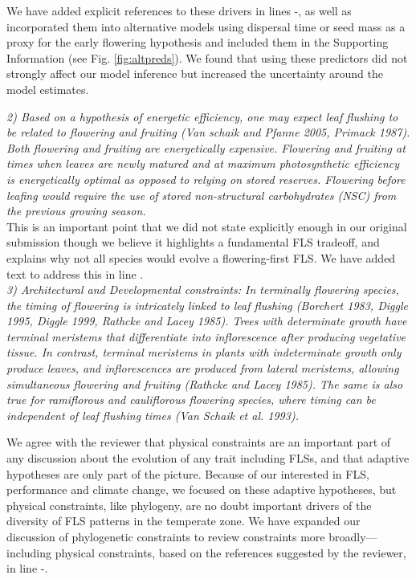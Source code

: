\documentclass{article}[11pt]
\begin{document}
We have added explicit references to these drivers in lines -, as well as incorporated them into alternative models using dispersal time or seed mass as a proxy for the early flowering hypothesis and included them in the Supporting Information (see Fig. \ref{fig:altpreds}). We found that using these predictors did not strongly affect our model inference but increased the uncertainty around the model estimates.

\emph{2) Based on a hypothesis of energetic efficiency, one may expect leaf flushing to be related to flowering and fruiting (Van schaik and Pfanne 2005, Primack 1987). Both flowering and fruiting are energetically expensive. Flowering and fruiting at times when leaves are newly matured and at maximum photosynthetic efficiency is energetically optimal as opposed to relying on stored reserves. Flowering before leafing would require the use of stored non-structural carbohydrates (NSC) from the previous growing season.}\\

\noindent This is an important point that we did not state explicitly enough in our original submission though we believe it highlights a fundamental FLS tradeoff, and explains why not all species would evolve a flowering-first FLS. We have added text to address this in line .\\

\emph{3) Architectural and Developmental constraints: In terminally flowering species, the timing of flowering is intricately linked to leaf flushing (Borchert 1983, Diggle 1995, Diggle 1999, Rathcke and Lacey 1985). Trees with determinate growth have terminal meristems that differentiate into inflorescence after producing vegetative tissue. In contrast, terminal meristems in plants with indeterminate growth only produce leaves, and inflorescences are produced from lateral meristems, allowing simultaneous flowering and fruiting (Rathcke and Lacey 1985). The same is also true for ramiflorous and cauliflorous flowering species, where timing can be independent of leaf flushing times (Van Schaik et al. 1993).}

\noindent We agree with the reviewer that physical constraints are an important part of any discussion about the evolution of any trait including FLSs, and that adaptive hypotheses are only part of the picture. Because of our interested in FLS, performance and climate change, we focused on these adaptive hypotheses, but physical constraints, like phylogeny, are no doubt important drivers of the diversity of FLS patterns in the temperate zone. We have expanded our discussion of phylogenetic constraints to review constraints more broadly---including physical constraints, based on the references suggested by the reviewer, in line -.\\
\end{document}

